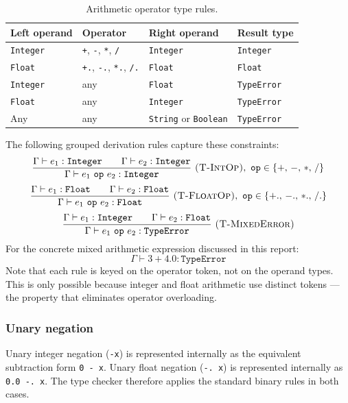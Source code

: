 \begin{table}[H]
\centering
\caption{Arithmetic operator type rules.\label{tab:arithmetic-result-types}}
\small
\begin{tabular}{llll}
\toprule
Left operand & Operator & Right operand & Result type \\
\midrule
\texttt{Integer} & \texttt{+}, \texttt{-}, \texttt{*}, \texttt{/} & \texttt{Integer} & \texttt{Integer} \\
\texttt{Float}   & \texttt{+.}, \texttt{-.}, \texttt{*.}, \texttt{/.} & \texttt{Float} & \texttt{Float} \\
\texttt{Integer} & any & \texttt{Float} & \texttt{TypeError} \\
\texttt{Float} & any & \texttt{Integer} & \texttt{TypeError} \\
Any & any & \texttt{String} or \texttt{Boolean} & \texttt{TypeError} \\
\bottomrule
\end{tabular}
\end{table}

The following grouped derivation rules capture these constraints:
\[
\frac{\Gamma \vdash e_1 : \texttt{Integer} \qquad \Gamma \vdash e_2 : \texttt{Integer}}
     {\Gamma \vdash e_1\ \mathtt{op}\ e_2 : \texttt{Integer}}
\ \textsc{(T-IntOp)},\ \mathtt{op} \in \{+,\,-,\,*,\,/\}
\]
\[
\frac{\Gamma \vdash e_1 : \texttt{Float} \qquad \Gamma \vdash e_2 : \texttt{Float}}
     {\Gamma \vdash e_1\ \mathtt{op}\ e_2 : \texttt{Float}}
\ \textsc{(T-FloatOp)},\ \mathtt{op} \in \{+.,\,-.,\,*.,\,/.\}
\]
\[
\frac{\Gamma \vdash e_1 : \texttt{Integer} \qquad \Gamma \vdash e_2 : \texttt{Float}}
     {\Gamma \vdash e_1\ \mathtt{op}\ e_2 : \texttt{TypeError}}
\ \textsc{(T-MixedError)}
\]
For the concrete mixed arithmetic expression discussed in this report:
\[
\Gamma \vdash 3 + 4.0 : \texttt{TypeError}
\]
Note that each rule is keyed on the operator token, not on the operand types.
This is only possible because integer and float arithmetic use distinct tokens
--- the property that eliminates operator overloading.

\subsubsection*{Unary negation}
Unary integer negation (\texttt{-x}) is represented internally as the
equivalent subtraction form \texttt{0 - x}. Unary float negation (\verb|-. x|)
is represented internally as \verb|0.0 -. x|. The type checker therefore
applies the standard binary rules
in both cases.

